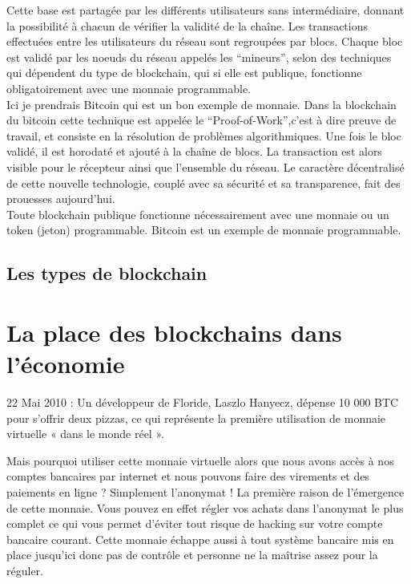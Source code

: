 \documentclass[12pt]{report}
\begin{document}
Cette base est partagée par les différents utilisateurs sans intermédiaire, donnant la possibilité à chacun de vérifier la validité de la chaîne. Les transactions effectuées entre les utilisateurs du réseau sont regroupées par blocs. Chaque bloc est validé par les noeuds du réseau appelés les “mineurs”, selon des techniques qui dépendent du type de blockchain, qui si elle est publique, fonctionne obligatoirement avec une monnaie programmable. \\

Ici je prendrais Bitcoin qui est un bon exemple de monnaie. Dans la blockchain du bitcoin cette technique est appelée le “Proof-of-Work”,c’est à dire preuve de travail, et consiste en la résolution de problèmes algorithmiques. Une fois le bloc validé, il est horodaté et ajouté à la chaîne de blocs. La transaction est alors visible pour le récepteur ainsi que l’ensemble du réseau. Le caractère décentralisé de cette nouvelle technologie, couplé avec sa sécurité et sa transparence, fait des prouesses aujourd’hui.\\

Toute blockchain publique fonctionne nécessairement avec une monnaie ou un token (jeton) programmable. Bitcoin est un exemple de monnaie programmable.

	\subsection{Les types de blockchain}


\newpage
\section{La place des blockchains dans l'économie}

22 Mai 2010 : Un développeur de Floride, Laszlo Hanyecz, dépense 10 000 BTC pour s’offrir deux pizzas, ce qui représente la première utilisation de monnaie virtuelle « dans le monde réel ».

Mais pourquoi utiliser cette monnaie virtuelle alors que nous avons accès à nos comptes bancaires par internet et nous pouvons faire des virements et des paiements en ligne ?
Simplement l’anonymat ! La première raison de l’émergence de cette monnaie. Vous pouvez en effet régler vos achats dans l’anonymat le plus complet ce qui vous permet d’éviter tout risque de hacking sur votre compte bancaire courant. Cette monnaie échappe aussi à tout système bancaire mis en place jusqu’ici  donc pas de contrôle et personne ne la maîtrise assez pour la réguler.\\
\end{document}
